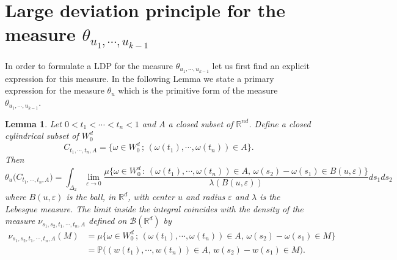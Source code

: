 \documentclass[]{interact}
\newcommand{\R}{{\mathbb{R}}}
\newcommand{\1}{\mathbf{1}}
\newcommand{\ve}{\varepsilon}
\newcommand{\PP}{{\mathbb{P}}}
\theoremstyle{plain}%
\newtheorem{lem}[thm]{Lemma}
\theoremstyle{definition}
\theoremstyle{remark}
\begin{document}
\section{Large deviation principle for the measure $\theta_{u_1,\cdots,u_{k-1}}$}
\label{sec3}
In order to formulate a LDP for the measure $\theta_{u_1,\cdots,u_{k-1}}$ let us first find an explicit expression for this measure. In the following Lemma we state a primary expression for the measure $\theta_u$ which is the primitive form of the measure $\theta_{u_1,\cdots,u_{k-1}}$. 

\begin{lem}\label{lem1}
Let $0<t_1<\cdots<t_n<1$ and $A$ a closed subset of $\R^{nd}$. Define a closed cylindrical subset of $W_0^d$  
$$ C_{t_1,\cdots,t_n,A}=\{ \omega \in W_0^d\, ;\, (\omega (t_1),\cdots,\omega(t_n))\in A\}. $$
Then 
$$\theta_u\big(C_{t_1,\cdots,t_n,A}\big)=\int_{\Delta_2  } \lim_{\ve \to 0} \dfrac{ \mu \big\{ \omega \in W_0^d\, :\,  (\omega (t_1),\cdots,\omega(t_n))\in A, \, \omega(s_2)-\omega(s_1)\in B(u,\ve)\big\} }{ \lambda (B(u,\ve)) } ds_1ds_2 $$
where $B(u,\ve)$ is the ball, in $\R^d$, with center $u$ and radius $\ve$ and $\lambda$ is the Lebesgue measure. The limit inside the integral coincides with the density of the measure $\nu_{s_1,s_2,t_1,\cdots,t_n,A}$ defined on $\mathcal{B}(\R^d)$ by 
\begin{align*}
\nu_{s_1,s_2,t_1,\cdots,t_n,A} (M)
&=\mu \big\{ \omega \in W_0^d\, ;\, (\omega (t_1),\cdots,\omega(t_n))\in A , \, \omega(s_2)-\omega(s_1)\in M\big\}\\
&=\PP \big( (w (t_1),\cdots,w(t_n))\in A , \, w(s_2)-w(s_1)\in M\big). 
\end{align*} 
\end{lem}
\end{document}
